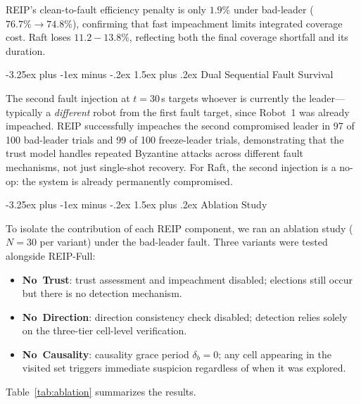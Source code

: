 \documentclass[conference]{IEEEtran}
\makeatletter
\renewcommand{\subsection}{\@startsection{subsection}{2}{\z@}%
  {-3.25ex plus -1ex minus -.2ex}%
  {1.5ex plus .2ex}%
  {\normalfont\normalsize\itshape\centering}}
\makeatother
\begin{document}
REIP's clean-to-fault efficiency penalty is only $1.9\%$ under bad-leader ($76.7\% \to 74.8\%$), confirming that fast impeachment limits integrated coverage cost. Raft loses $11.2{-}13.8\%$, reflecting both the final coverage shortfall and its duration.

\subsection{Dual Sequential Fault Survival}

The second fault injection at $t{=}30\,$s targets whoever is currently the leader---typically a \emph{different} robot from the first fault target, since Robot~1 was already impeached. REIP successfully impeaches the second compromised leader in 97 of 100 bad-leader trials and 99 of 100 freeze-leader trials, demonstrating that the trust model handles repeated Byzantine attacks across different fault mechanisms, not just single-shot recovery. For Raft, the second injection is a no-op: the system is already permanently compromised.

\subsection{Ablation Study}
\label{sec:ablation}

To isolate the contribution of each REIP component, we ran an ablation study ($N{=}30$ per variant) under the bad-leader fault. Three variants were tested alongside REIP-Full:
\begin{itemize}
    \item \textbf{No~Trust}: trust assessment and impeachment disabled; elections still occur but there is no detection mechanism.
    \item \textbf{No~Direction}: direction consistency check disabled; detection relies solely on the three-tier cell-level verification.
    \item \textbf{No~Causality}: causality grace period $\delta_b = 0$; any cell appearing in the visited set triggers immediate suspicion regardless of when it was explored.
\end{itemize}

Table~\ref{tab:ablation} summarizes the results.
\end{document}
